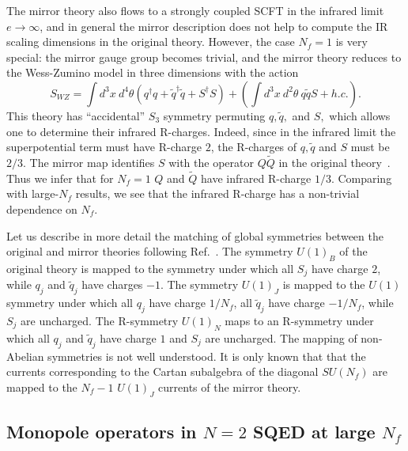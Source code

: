 \documentclass[a4paper,12pt, amsfonts, amssymb]{article}
\newcommand{\ra}{\rightarrow}
\newcommand{\tQ}{{\tilde Q}}
\newcommand{\tq}{{\tilde q}}
\begin{document}
The mirror theory also flows to a strongly coupled SCFT in the infrared
limit $e\ra\infty$, and in general the mirror description does not help to 
compute the IR scaling dimensions in the original theory. 
However, the case $N_f=1$ is very special: the mirror gauge group becomes
trivial, and the mirror theory reduces to the
Wess-Zumino model in three dimensions with the action
$$
S_{WZ}=\int d^3x\ d^4\theta\left(q^\dag q+ \tq^\dag\tq + S^\dag S\right)
+\left(\int d^3x\ d^2\theta\ q\tq S + h.c.\right).
$$
This theory has ``accidental'' $S_3$ symmetry permuting $q,\tq,$ and
$S,$ which allows one to determine their infrared R-charges. Indeed, since
in the infrared limit the superpotential term must have R-charge $2$,
the R-charges of $q,\tq$ and $S$ must be $2/3$. The mirror map identifies $S$ with the operator $Q\tQ$ in the original theory~\cite{five}.
Thus we infer that for $N_f=1$ $Q$ and $\tQ$ have infrared R-charge $1/3$. 
Comparing with large-$N_f$ results, we see that the infrared R-charge has a non-trivial dependence on $N_f$. 

Let us describe in more detail the matching of global symmetries between
the original and mirror theories following Ref.~\cite{five}. 
The symmetry $U(1)_B$ of the original
theory is mapped to the symmetry under which all $S_j$ have charge $2$, while $q_j$ and $\tq_j$ have charges $-1$. The symmetry $U(1)_J$ is mapped to 
the $U(1)$ symmetry under which all $q_j$ have charge $1/N_f$, all $\tq_j$
have charge $-1/N_f$, while $S_j$ are uncharged. The R-symmetry $U(1)_N$
maps to an R-symmetry under which all $q_j$ and $\tq_j$ have charge $1$ 
and $S_j$ are uncharged. The mapping of non-Abelian
symmetries is not well understood. It is only known that that the currents
corresponding to the Cartan subalgebra of the diagonal $SU(N_f)$ are mapped 
to the $N_f-1$ $U(1)_J$ currents of the mirror theory. 

\subsection{Monopole operators in $N=2$ SQED at large $N_f$}
\end{document}
